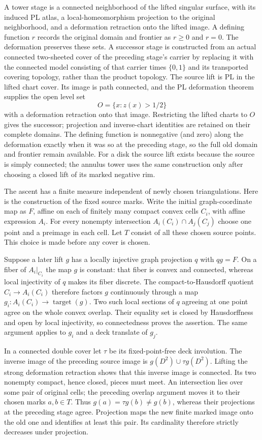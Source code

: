 A tower stage is a connected neighborhood of the lifted singular
surface, with its induced PL atlas, a local-homeomorphism projection
to the original neighborhood, and a deformation retraction onto the
lifted image.  A defining function $r$ records the original domain
and frontier as $r\geq0$ and $r=0$.  The deformation preserves these
sets.  A successor stage is constructed from an actual connected
two-sheeted cover of the preceding stage's carrier by replacing it
with the connected model consisting of that carrier times
$\{0,1\}$ and its transported covering topology, rather than the product topology.
The source lift is PL in the lifted chart cover.  Its image is path
connected, and the PL deformation theorem supplies the open level set
\[
 O=\{x:z(x)>1/2\}
\]
with a deformation retraction onto that image.  Restricting the lifted
charts to $O$ gives the successor; projection and inverse-chart
identities are retained on their complete domains.  The defining
function is nonnegative (and zero) along the deformation exactly when
it was so at the preceding stage, so the full old domain and frontier
remain available.  For a disk the source lift exists because the source
is simply connected; the annulus tower uses the same construction only
after choosing a closed lift of its marked negative rim.

The ascent has a finite measure independent of newly chosen
triangulations.  Here is the construction of the fixed source marks.
Write the initial graph-coordinate map as $F$, affine on each of
finitely many compact convex cells $C_i$, with affine expression $A_i$.
For every nonempty intersection $A_i(C_i)\cap A_j(C_j)$ choose one
point and a preimage in each cell.  Let $T$ consist of all these
chosen source points.  This choice is made before any cover is chosen.

Suppose a later lift $g$ has a locally injective graph projection $q$
with $qg=F$.  On a fiber of $A_i|_{C_i}$ the map $g$ is constant:
that fiber is convex and connected, whereas local injectivity of $q$
makes its fiber discrete.  The compact-to-Hausdorff quotient
$C_i\to A_i(C_i)$ therefore factors $g$ continuously through a map
$g_i:A_i(C_i)\to\operatorname{target}(g)$.  Two such local sections
of $q$ agreeing at one point agree on the whole convex overlap.
Their equality set is closed by Hausdorffness and open by local
injectivity, so connectedness proves the assertion.  The same
argument applies to $g_i$ and a deck translate of $g_j$.

In a connected double cover let $\tau$ be its fixed-point-free deck
involution.  The inverse image of the preceding source image is
$g(D^2)\cup\tau g(D^2)$.  Lifting the strong deformation retraction
shows that this inverse image is connected.  Its two nonempty
compact, hence closed, pieces must meet.  An intersection lies over
some pair of original cells; the preceding overlap argument moves
it to their chosen marks $a,b\in T$.  Thus
$g(a)=\tau g(b)\ne g(b)$, whereas their projections at the preceding
stage agree.  Projection maps the new finite marked image onto the
old one and identifies at least this pair.  Its cardinality therefore
strictly decreases under projection.

